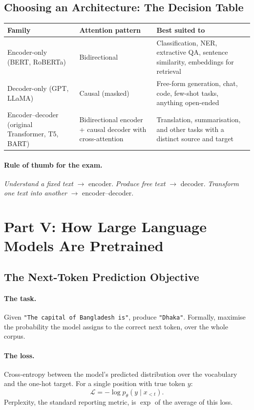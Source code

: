 \documentclass[11pt,a4paper]{article}
\begin{document}
\subsection{Choosing an Architecture: The Decision Table}

\begin{center}
\begin{tabularx}{\textwidth}{lYY}
\textbf{Family} & \textbf{Attention pattern} & \textbf{Best suited to} \\
\hline
Encoder-only (BERT, RoBERTa) & Bidirectional & Classification, NER, extractive QA,
sentence similarity, embeddings for retrieval \\
Decoder-only (GPT, LLaMA) & Causal (masked) & Free-form generation, chat, code, few-shot
tasks, anything open-ended \\
Encoder--decoder (original Transformer, T5, BART) & Bidirectional encoder + causal decoder
with cross-attention & Translation, summarisation, and other tasks with a distinct source
and target \\
\end{tabularx}
\end{center}

\paragraph{Rule of thumb for the exam.} \emph{Understand a fixed text} $\rightarrow$ encoder.
\emph{Produce free text} $\rightarrow$ decoder. \emph{Transform one text into another}
$\rightarrow$ encoder--decoder.

\section{Part V: How Large Language Models Are Pretrained}

\subsection{The Next-Token Prediction Objective}

\paragraph{The task.} Given \texttt{"The capital of Bangladesh is"}, produce
\texttt{"Dhaka"}. Formally, maximise the probability the model assigns to the correct next
token, over the whole corpus.

\paragraph{The loss.} Cross-entropy between the model's predicted distribution over the
vocabulary and the one-hot target. For a single position with true token $y$:
\[
\mathcal{L} = -\log p_\theta(y \mid x_{<t}).
\]
Perplexity, the standard reporting metric, is $\exp$ of the average of this loss.
\end{document}
